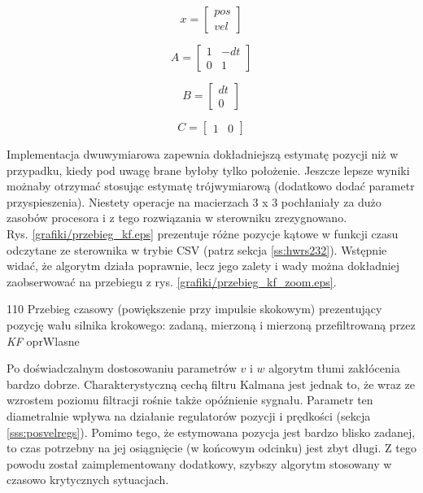 \begin{equation} \label{eq:alg6}
	x = \begin{bmatrix}
       	pos \\ 
       	vel
     	\end{bmatrix}
\end{equation}

\begin{equation} \label{eq:alg7}
	A = \begin{bmatrix}
       	1 & -dt \\ 
       	0 & 1
     	\end{bmatrix}
\end{equation}

\begin{equation} \label{eq:alg8}
	B = \begin{bmatrix}
       	dt \\ 
       	0
     	\end{bmatrix}
\end{equation}

\begin{equation} \label{eq:alg9}
	C = \begin{bmatrix}
       	1 & 0 
     	\end{bmatrix}
\end{equation}

Implementacja dwuwymiarowa zapewnia dokładniejszą estymatę pozycji niż w przypadku, kiedy pod uwagę brane byłoby tylko położenie. Jeszcze lepsze wyniki możnaby otrzymać stosując estymatę trójwymiarową (dodatkowo dodać parametr przyspieszenia). Niestety operacje na macierzach 3 x 3 pochłaniały za dużo zasobów procesora i z tego rozwiązania w sterowniku zrezygnowano. \\

Rys. \ref{grafiki/przebieg_kf.eps} prezentuje różne pozycje kątowe w funkcji czasu odczytane ze sterownika w trybie CSV (patrz sekcja \ref{ss:hwrs232}). Wstępnie widać, że algorytm działa poprawnie, lecz jego zalety i wady można dokładniej zaobserwować na przebiegu z rys. \ref{grafiki/przebieg_kf_zoom.eps}.

	{110}
	{Przebieg czasowy (powiększenie przy impulsie skokowym) prezentujący pozycję wału silnika krokowego: zadaną, mierzoną i mierzoną przefiltrowaną przez {\it KF}}
	{oprWlasne}
	
Po doświadczalnym dostosowaniu parametrów $ v $ i $ w $ algorytm tłumi zakłócenia bardzo dobrze. Charakterystyczną cechą filtru Kalmana jest jednak to, że wraz ze wzrostem poziomu filtracji rośnie także opóźnienie sygnału. Parametr ten diametralnie wpływa na działanie regulatorów pozycji i prędkości (sekcja \ref{sss:posvelregs}). Pomimo tego, że estymowana pozycja jest bardzo blisko zadanej, to czas potrzebny na jej osiągnięcie (w końcowym odcinku) jest zbyt długi. Z tego powodu został zaimplementowany dodatkowy, szybszy algorytm stosowany w czasowo krytycznych sytuacjach.

